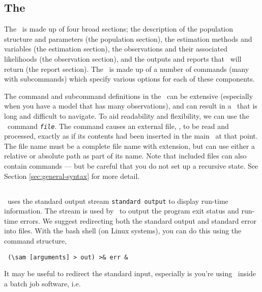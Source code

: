 \subsection{The \config\label{sec:config-files}}
\CH
The \config\ is made up of four broad sections; the description of the population structure and parameters (the population section), the estimation methods and variables (the estimation section), the observations and their associated likelihoods (the observation section), and the outputs and reports that \SAM\ will return (the report section). The \config\ is made up of a number of commands (many with subcommands) which specify various options for each of these components.

The command and subcommand definitions in the \config\ can be extensive (especially when you have a model that has many observations), and can result in a \config\ that is long and difficult to navigate. To aid readability and flexibility, we can use the \config\ command  \texttt{\emph{file}}. The command causes an external file, , to be read and processed, exactly as if its contents had been inserted in the main \config\ at that point. The file name must be a complete file name with extension, but can use either a relative or absolute path as part of its name. Note that included files can also contain  commands --- but be careful that you do not set up a recursive state. See Section \ref{sec:general-syntax} for more detail.

\subsection{\label{sec:redirecting-stdout}}
\CH
\SAM\ uses the standard output stream \texttt{standard output} to display run-time information. The  stream is used by \SAM\ to output the program exit status and run-time errors. We suggest redirecting both the standard output and standard error into files. With the bash shell (on Linux systems), you can do this using the command structure,

\begin{verbatim} (\sam [arguments] > out) >& err &\end{verbatim}

It may be useful to redirect the standard input, especially is you're using \SAM\ inside a batch job software, i.e. 

